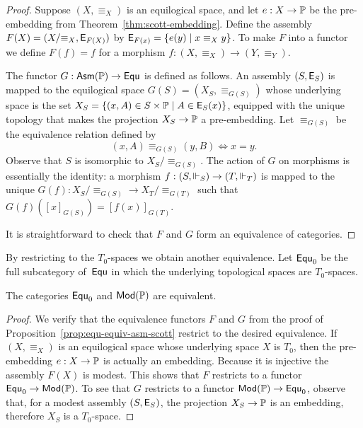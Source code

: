 \begin{proof}
  Suppose $(X, {\equiv_X})$ is an equilogical space, and let $e : X
  \to \mathbb{P}$ be the pre-embedding from
  Theorem~\ref{thm:scott-embedding}. Define the assembly $F(X) =
  (X/{\equiv_X}, \mathsf{E}_{F(X)})$ by $\mathsf{E}_{F(x)} = \{e(y) \mid x
    \equiv_X y\}$. To make $F$ into a functor we define $F(f) = f$ for
  a morphism $f : (X, {\equiv_X}) \to (Y, {\equiv_Y})$.

  The functor $G : \mathsf{Asm}(\mathbb{P}) \to \mathsf{Equ}$ is defined as follows. An
  assembly $(S, \mathsf{E}_S)$ is mapped to the equilogical space $G(S) =
  (X_S, \equiv_{G(S)})$ whose underlying space is the set $X_S =
  \{(x,A) \in S \times \mathbb{P} \mid A \in \mathsf{E}_S(x)\}$, equipped with
  the unique topology that makes the projection $X_S \to \mathbb{P}$ a
  pre-embedding. Let $\equiv_{G(S)}$ be the equivalence relation
  defined by
  \begin{equation*}
    (x,A) \equiv_{G(S)} (y,B) \iff x = y.
  \end{equation*}
  Observe that $S$ is isomorphic to $X_S/{\equiv_{G(S)}}$. The action
  of $G$ on morphisms is essentially the identity: a morphism $f : (S,
  {\Vdash_S}) \to (T, {\Vdash_T})$ is mapped to the unique $G(f) :
  X_S/{\equiv_{G(S)}} \to X_T/{\equiv_{G(T)}}$ such that
  $G(f)([x]_{G(S)}) = [f(x)]_{G(T)}$.

  It is straightforward to check that $F$ and $G$ form an equivalence
  of categories.
\end{proof}

By restricting to the $T_0$-spaces we obtain another equivalence. Let
$\mathsf{Equ}_0$ be the full subcategory of~$\mathsf{Equ}$ in which the underlying
topological spaces are $T_0$-spaces.


\begin{proposition}
  \label{prop:equ0-equiv-mod-scott}
  The categories $\mathsf{Equ}_0$ and $\mathsf{Mod}(\mathbb{P})$ are equivalent.
\end{proposition}

\begin{proof}
  We verify that the equivalence functors $F$ and $G$ from the proof
  of Proposition~\ref{prop:equ-equiv-asm-scott} restrict to the
  desired equivalence. If $(X, {\equiv_X})$ is an equilogical space
  whose underlying space $X$ is $T_0$, then the pre-embedding $e : X
  \to \mathbb{P}$ is actually an embedding. Because it is injective the
  assembly $F(X)$ is modest. This shows that $F$ restricts to a
  functor $\mathsf{Equ}_0 \to \mathsf{Mod}(\mathbb{P})$.
  To see that $G$ restricts to a functor $\mathsf{Mod}(\mathbb{P}) \to \mathsf{Equ}_0$,
  observe that, for a modest assembly $(S, \mathsf{E}_S)$, the projection
  $X_S \to \mathbb{P}$ is an embedding, therefore $X_S$ is a $T_0$-space.
\end{proof}

